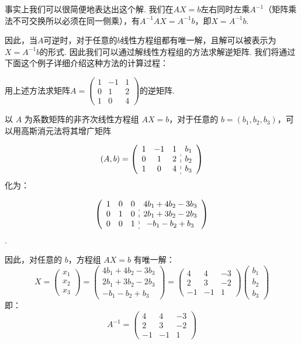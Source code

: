 事实上我们可以很简便地表达出这个解. 我们在$AX=b$左右同时左乘$A^{-1}$（矩阵乘法不可交换所以必须在同一侧乘），有$A^{-1}AX=A^{-1}b$，即$X=A^{-1}b$.

因此，当$A$可逆时，对于任意的$b$线性方程组都有唯一解，且解可以被表示为$X=A^{-1}b$的形式. 因此我们可以通过解线性方程组的方法求解逆矩阵. 我们将通过下面这个例子详细介绍这种方法的计算过程：
\begin{example}{}{}
    用上述方法求矩阵$A=\begin{pmatrix}1 & -1 & 1 \\ 0 & 1 & 2 \\ 1 & 0 & 4\end{pmatrix}$的逆矩阵.
\end{example}

\begin{solution}
    以 $A$ 为系数矩阵的非齐次线性方程组 $AX=b$，对于任意的 $b=(b_1,b_2,b_3)$，可以用高斯消元法将其增广矩阵

    \[(A,b)=\left(\begin{array}{ccc:c}
                1 & -1 & 1 & b_1 \\
                0 & 1  & 2 & b_2 \\
                1 & 0  & 4 & b_3
            \end{array}\right)\] 化为：

    \[\left(\begin{array}{ccc:c}
                1 & 0 & 0 & 4b_1+4b_2-3b_3 \\
                0 & 1 & 0 & 2b_1+3b_2-2b_3 \\
                0 & 0 & 1 & -b_1-b_2+b_3
            \end{array}\right)\].

    因此，对任意的 $b$，方程组 $AX=b$ 有唯一解：
    \[X=\begin{pmatrix}x_1\\x_2\\x_3\end{pmatrix}=\begin{pmatrix}
            4b_1+4b_2-3b_3 \\2b_1+3b_2-2b_3\\-b_1-b_2+b_3
        \end{pmatrix}=\begin{pmatrix}
            4  & 4  & -3 \\
            2  & 3  & -2 \\
            -1 & -1 & 1
        \end{pmatrix}\begin{pmatrix}b_1\\b_2\\b_3\end{pmatrix}\] 即：
    \[A^{-1}=\begin{pmatrix}
            4  & 4  & -3 \\
            2  & 3  & -2 \\
            -1 & -1 & 1
        \end{pmatrix}\]
\end{solution}

